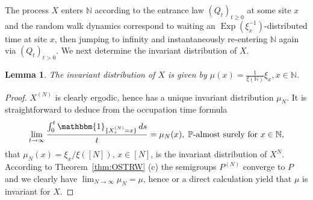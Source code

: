 \documentclass[11pt,a4paper]{scrartcl}
\numberwithin{equation}{section}
\theoremstyle{plain}
\newtheorem{lemma}[theorem]{Lemma}
\theoremstyle{definition}
\theoremstyle{remark}
\newcommand{\bN}{\ensuremath{\mathbb{N}}}
\newcommand{\bP}{\ensuremath{\mathbb{P}}}
\newcommand{\ind}{\ensuremath{\mathbbm{1}}}
\newcommand{\di}{\,\textup{d}}
\begin{document}
The process $X$ enters $\bN$ according to the entrance law $(Q_t)_{t\geq0}$ at some site $x$ and the random walk dynamics correspond to waiting an $\operatorname{Exp}(\xi_x^{-1})$-distributed time at site $x$, then jumping to infinity and instantaneously re-entering $\bN$ again via $(Q_t)_{t>0}$. We next determine the invariant distribution of $X$. 
\begin{lemma}\label{lem:stationary}
The invariant distribution of $X$ is given by $\mu(x)=\frac{1}{\xi(\bN)} \xi_x, x\in\bN$.
\end{lemma}
\begin{proof}
$X^{(N)}$ is clearly ergodic, hence has a unique invariant distribution $\mu_N$. It is straightforward to deduce from the occupation time formula
$$
\lim_{t\to\infty}\frac{\int_0^t \ind_{\{X^{(N)}_s=x\}}\di s}{t}=\mu_N(x),\; \bP\text{-almost surely for } x\in\bN,
$$
 that $\mu_N(x)=\xi_x/\xi([N])$, $x\in[N]$, is the invariant distribution of $X^{N}$. According to Theorem~\ref{thm:OSTRW} (c) the semigroups $P^{(N)}$ converge to $P$ and we clearly have $\lim_{N\to\infty}\mu_N=\mu$, hence \cite[Theorem 9.10]{EthieKurtz86} or a direct calculation yield that $\mu$ is invariant for $X$.
\end{proof}
\end{document}
